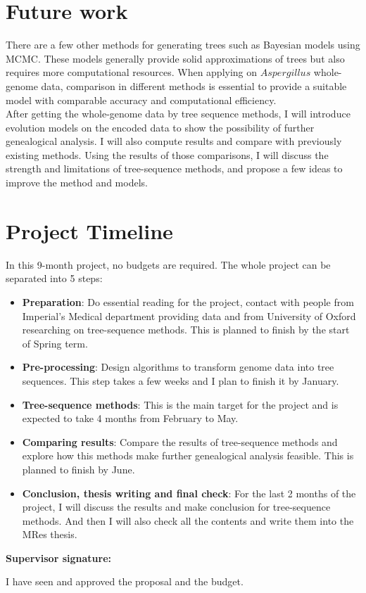 \documentclass[11pt]{article}
\begin{document}
\section{Future work}
There are a few other methods for generating trees such as Bayesian models using MCMC. These models generally provide solid approximations of trees but also requires more computational resources. When applying on $Aspergillus$ whole-genome data, comparison in different methods is essential to provide a suitable model with comparable accuracy and computational efficiency. \\
After getting the whole-genome data by tree sequence methods, I will introduce evolution models on the encoded data to show the possibility of further genealogical analysis. I will also compute results and compare with previously existing methods. Using the results of those comparisons, I will discuss the strength and limitations of tree-sequence methods, and propose a few ideas to improve the method and models.  

\section{Project Timeline}
In this 9-month project, no budgets are required. The whole project can be separated into 5 steps:
\begin{itemize}
    \item \textbf{Preparation}: Do essential reading for the project, contact with people from Imperial's Medical department providing data and from University of Oxford researching on tree-sequence methods. This is planned to finish by the start of Spring term.
    \item \textbf{Pre-processing}: Design algorithms to transform genome data into tree sequences. This step takes a few weeks and I plan to finish it by January.
    \item \textbf{Tree-sequence methods}: This is the main target for the project and is expected to take 4 months from February to May.
    \item \textbf{Comparing results}: Compare the results of tree-sequence methods and explore how this methods make further genealogical analysis feasible. This is planned to finish by June.
    \item \textbf{Conclusion, thesis writing and final check}: For the last 2 months of the project, I will discuss the results and make conclusion for tree-sequence methods. And then I will also check all the contents and write them into the MRes thesis.
\end{itemize}

\renewcommand\bibname{Reference}
\addcontentsline{toc}{chapter}{\bibname}



\newpage

\textbf{Supervisor signature:}

\vspace{3cm}

I have seen and approved the proposal and the budget.
\end{document}
